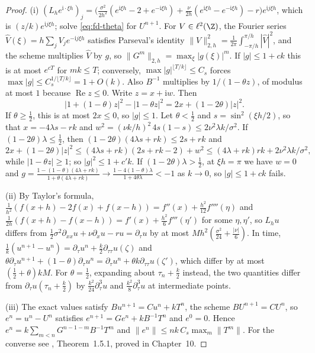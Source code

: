 \begin{proof}
(i) $(L_he^{\mathrm i\cdot\xi h})_j=\big(\frac{\sigma^2}{2h^2}(e^{\mathrm i\xi h}-2+e^{-\mathrm i\xi h})+\frac{\nu}{2h}(e^{\mathrm i\xi h}-e^{-\mathrm i\xi h})-r\big)e^{\mathrm ij\xi h}$,
which is $(z/k)e^{\mathrm ij\xi h}$; solve \eqref{eq:fd-theta} for $U^{n+1}$. For $V\in\ell^2(\Z)$, the Fourier series
$\hat V(\xi)=h\sum_jV_je^{-\mathrm ij\xi h}$ satisfies Parseval's identity $\|V\|_{2,h}^2=\frac1{2\pi}\int_{-\pi/h}^{\pi/h}|\hat V|^2$, and
the scheme multiplies $\hat V$ by $g$, so $\|G^m\|_{2,h}=\max_\xi|g(\xi)|^m$. If $|g|\le1+ck$ this is at most
$e^{cT}$ for $mk\le T$; conversely, $\max|g|^{\lfloor T/k\rfloor}\le C_s$ forces $\max|g|\le C_s^{1/\lfloor T/k\rfloor}=1+O(k)$. Also
$B^{-1}$ multiplies by $1/(1-\theta z)$, of modulus at most $1$ because $\operatorname{Re}z\le0$. Write $z=x+\mathrm iw$. Then
\[
  |1+(1-\theta)z|^2-|1-\theta z|^2=2x+(1-2\theta)|z|^2 .
\]
If $\theta\ge\frac12$, this is at most $2x\le0$, so $|g|\le1$. Let $\theta<\frac12$ and $s=\sin^2(\xi h/2)$, so that
$x=-4\lambda s-rk$ and $w^2=(\nu k/h)^2\,4s(1-s)\le2\nu^2\lambda k/\sigma^2$. If $(1-2\theta)\lambda\le\frac12$, then
$(1-2\theta)(4\lambda s+rk)\le2s+rk$ and
\[
  2x+(1-2\theta)|z|^2\le(4\lambda s+rk)(2s+rk-2)+w^2\le(4\lambda+rk)rk+2\nu^2\lambda k/\sigma^2,
\]
while $|1-\theta z|\ge1$; so $|g|^2\le1+c'k$. If $(1-2\theta)\lambda>\frac12$, at $\xi h=\pi$ we have $w=0$ and
$g=\frac{1-(1-\theta)(4\lambda+rk)}{1+\theta(4\lambda+rk)}\to\frac{1-4(1-\theta)\lambda}{1+4\theta\lambda}<-1$ as $k\to0$, so $|g|\le1+ck$ fails.

(ii) By Taylor's formula, $\frac1{h^2}(f(x+h)-2f(x)+f(x-h))=f''(x)+\frac{h^2}{12}f''''(\eta)$ and
$\frac1{2h}(f(x+h)-f(x-h))=f'(x)+\frac{h^2}6f'''(\eta')$ for some $\eta,\eta'$, so $L_hu$ differs from
$\frac12\sigma^2\partial_{xx}u+\nu\partial_xu-ru=\partial_\tau u$ by at most $Mh^2(\frac{\sigma^2}{24}+\frac{|\nu|}6)$. In time,
$\frac1k(u^{n+1}-u^n)=\partial_\tau u^n+\frac k2\partial_{\tau\tau}u(\zeta)$ and
$\theta\partial_\tau u^{n+1}+(1-\theta)\partial_\tau u^n=\partial_\tau u^n+\theta k\partial_{\tau\tau}u(\zeta')$, which differ by at most
$(\frac12+\theta)kM$. For $\theta=\frac12$, expanding about $\tau_n+\frac k2$ instead, the two quantities differ from
$\partial_\tau u(\tau_n+\frac k2)$ by $\frac{k^2}{24}\partial^3_\tau u$ and $\frac{k^2}8\partial^3_\tau u$ at intermediate points.

(iii) The exact values satisfy $Bu^{n+1}=Cu^n+kT^n$, the scheme $BU^{n+1}=CU^n$, so $e^n=u^n-U^n$
satisfies $e^{n+1}=Ge^n+kB^{-1}T^n$ and $e^0=0$. Hence $e^n=k\sum_{m<n}G^{n-1-m}B^{-1}T^m$ and
$\|e^n\|\le nk\,C_s\max_m\|T^m\|$. For the converse see \textcite{strikwerda-finite-difference},
Theorem~1.5.1, proved in Chapter~10.


\end{proof}
